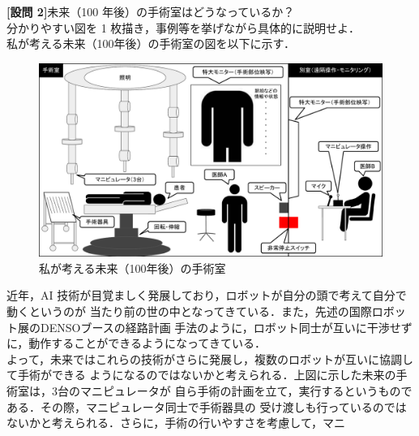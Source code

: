 \documentclass{jsarticle}
\begin{document}
\newpage

\vspace*{-10zh}

\textbf{{[設問 2]}}\hspace*{1zw}未来（100 年後）の手術室はどうなっているか？\\
\hspace*{5.7zw}分かりやすい図を 1 枚描き，事例等を挙げながら具体的に説明せよ．\\

\hspace*{5.7zw}私が考える未来（100年後）の手術室の図を以下に示す．

\begin{figure}[h!]
  \centering
  \includegraphics[width=160mm]{a.pdf}
  \caption{私が考える未来（100年後）の手術室}
\end{figure}
\vspace*{-1zh}
\hspace*{5.7zw}近年，AI 技術が目覚ましく発展しており，ロボットが自分の頭で考えて自分で動くというのが
\hspace*{5.7zw}当たり前の世の中となってきている．また，先述の国際ロボット展のDENSOブースの経路計画
\hspace*{5.7zw}手法のように，ロボット同士が互いに干渉せずに，動作することができるようになってきている．\\
\hspace*{5.7zw}よって，未来ではこれらの技術がさらに発展し，複数のロボットが互いに協調して手術ができる
\hspace*{5.7zw}ようになるのではないかと考えられる．上図に示した未来の手術室は，3台のマニピュレータが
\hspace*{5.7zw}自ら手術の計画を立て，実行するというものである．その際，マニピュレータ同士で手術器具の
\hspace*{5.7zw}受け渡しも行っているのではないかと考えられる．さらに，手術の行いやすさを考慮して，マニ
\end{document}
